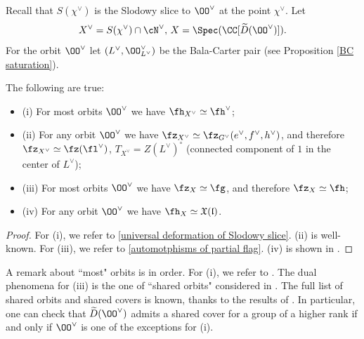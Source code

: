 \documentclass[12pt]{amsart}
\begin{document}
    Recall that $S(\chi^\vee)$ is the Slodowy slice to $\OO^\vee$ at the point $\chi^\vee$. Let 
    \begin{equation*}
    X^\vee=S(\chi^\vee)\cap \cN^\vee,\, X=\Spec(\CC[\widetilde{D}(\OO^\vee)]).
    \end{equation*}
    For the orbit $\OO^\vee$ let $(L^\vee, \OO_{L^\vee}^\vee)$ be the Bala-Carter pair (see Proposition \ref{BC saturation}). 
    \begin{prop}\label{prop_spaces_for_orbits_slodowy}
        The following are true:
        \begin{itemize}
            \item(i) For most orbits $\OO^\vee$ we have $\fh_{X^\vee}\simeq \fh^\vee$;
            \item(ii) For any orbit $\OO^\vee$ we have $\fz_{X^\vee}\simeq \fz_{G^\vee}(e^\vee, f^\vee, h^\vee)$, and therefore $\fz_{X^\vee}\simeq \fz(\fl^\vee)$, $T_{X^\vee}=Z ({L^\vee})^\circ$ (connected component of $1$ in the center of $L^\vee$);
            \item(iii) For most orbits $\OO^\vee$ we have $\fz_{X}\simeq \fg$, and therefore $\fz_X\simeq \fh$;
            \item(iv) For any orbit $\OO^\vee$ we have $\fh_{X}\simeq \mathfrak{X}(\mathfrak{l})$.
        \end{itemize}
    \end{prop}
    \begin{proof}
         For (i), we refer to \cref{universal deformation of Slodowy slice}. (ii) is well-known.
         For (iii), we refer to \cref{automotphisms of partial flag}. (iv) is shown in \cite[Proposition 7.2.2(i)]{LMBM}.
    \end{proof}
    A remark about ``most" orbits is in order. For (i), we refer to \cite[Theorem 1.3]{Lehn_2011}. The dual phenomena for (iii) is the one of ``shared orbits" considered in \cite{BrylinskiKostant1994}. The full list of shared orbits and shared covers is known, thanks to the results of \cite{FJLS2023}. In particular, one can check that $\widetilde{D}(\OO^\vee)$ admits a shared cover for a group of a higher rank if and only if $\OO^\vee$ is one of the exceptions for (i). 
    
\end{document}

